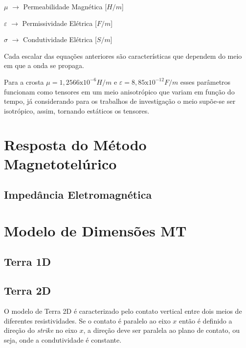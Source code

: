            $\mu$ $\rightarrow$ Permeabilidade Magnética [$H/m$]
	    
            $\varepsilon$ $\rightarrow$ Permissividade Elétrica [$F/m$]
	    
            $\sigma$ $\rightarrow$ Condutividade Elétrica [$S/m$]
	    
            Cada escalar das equações anteriores são características que dependem do meio em que a onda se propaga.
	    
            Para a crosta $\mu = 1,2566\textrm{x}10^{-6} H/m$ e $\varepsilon = 8,85
            \textrm{x}10^{-12} F/m$ esses parâmetros funcionam como tensores em um meio
            anisotrópico que variam em função do tempo, já considerando para os 
            trabalhos de investigação o meio supõe-se ser isotrópico, assim, 
            tornando estáticos os tensores.
	
    
    
    
    
    
    \section{Resposta do Método Magnetotelúrico}
        \subsection{Impedância Eletromagnética}
        
        
        
    
    
    
    \section{Modelo de Dimensões MT}
        \subsection{Terra 1D}
        \subsection{Terra 2D}
        
        O modelo de Terra 2D é caracterizado pelo contato vertical entre dois meios de diferentes resistividades. Se o contato é
	    paralelo ao eixo $x$ então é definido a direção do \textit{strike} no eixo $x$, a direção deve ser paralela ao plano de contato,
	    ou seja, onde a condutividade é constante.%
	    
